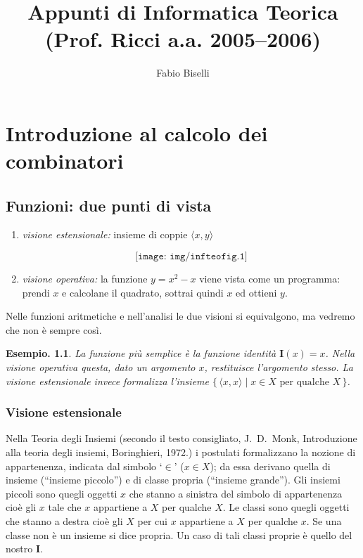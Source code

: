 \documentclass{book}
\author{Fabio Biselli}
\title{Appunti di Informatica Teorica\\ (Prof. Ricci a.a. 2005--2006)}
\date {}
\newtheorem{esempio}{Esempio.}
\begin{document}
\maketitle

\tableofcontents

\chapter{Introduzione al calcolo dei combinatori}

\section{Funzioni: due punti di vista}

\begin{enumerate}
\item \emph{visione estensionale:} insieme di coppie  $\langle x, y\rangle$

\[\texttt{[image: img/infteofig.1]}\]


\item \emph{visione operativa:} la funzione $y = x^{2} - x$  viene vista come
un programma:
prendi $x$ e calcolane il quadrato, sottrai quindi $x$ ed ottieni $y$.
\end{enumerate}

Nelle funzioni aritmetiche e nell'analisi le due visioni si equivalgono,
ma vedremo che non \`e sempre cos\`i.

\begin{esempio}
La funzione pi\`u semplice \`e la funzione identit\`a $\mathbf{I}(x) = x$.
Nella visione operativa questa, dato un argomento $x$, restituisce
l'argomento stesso. La visione estensionale invece formalizza l'insieme
$\bigl\{\, \langle x, x \rangle \mid x \in X \text{ per qualche }X\,\bigr\}$.
\end{esempio}

\subsection{Visione estensionale}Nella Teoria degli Insiemi (secondo il testo
consigliato, J.~D.~Monk, Introduzione alla teoria degli insiemi, Boringhieri, 
1972.) i postulati formalizzano la nozione di appartenenza,
indicata dal simbolo `$\in$' ($x \in X$); da essa derivano quella di
insieme (``insieme piccolo'') e di classe propria (``insieme
grande''). Gli insiemi piccoli sono quegli oggetti $x$ che stanno a
sinistra del simbolo di appartenenza cio\`e gli $x$ tale che $x$
appartiene a $X$ per qualche $X$. Le classi sono quegli oggetti che
stanno a destra cio\`e gli $X$ per cui $x$ appartiene a $X$ per
qualche $x$. Se una classe non \`e un insieme si dice propria. Un
caso di tali classi proprie \`e quello del nostro $\mathbf{I}$.
\end{document}

